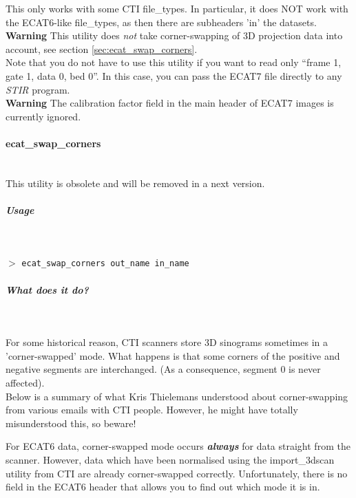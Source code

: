 \documentclass{article}
\newcommand{\subsubsubsection}[1]{\paragraph{#1}\mbox{} \\}
\newcommand{\subsubsubsubsection}[1]{\subparagraph{#1} \mbox{} \\}
\newcommand{\cmdline}[1]{\par \noindent $>$ \texttt{#1}\par}
\begin{document}
{{This only works with some CTI file\_types. In particular, it 
does NOT work with the ECAT6-like file\_types, as then there 
are subheaders 'in' the datasets.\\
\textbf{Warning} This utility does \textit{not} take corner-swapping of 
3D projection data into account, see section \ref{sec:ecat_swap_corners}.\\
Note that you do not have to use this utility if you want to 
read only ``frame 1, gate 1, data 0, bed 0''. In this case, you 
can pass the ECAT7 file directly to any \textit{STIR} program.
\\
\textbf{Warning} The calibration factor field in the main header of ECAT7 images
is currently ignored.

\subsubsubsection{ecat\_swap\_corners}
\label{sec:ecat_swap_corners}
This utility is obsolete and will be removed in a next version.
{ \subsubsubsubsection{Usage}
}
\cmdline{ecat\_swap\_corners out\_name in\_name}

{ \subsubsubsubsection{What does it do?}
}
For some historical reason, CTI scanners store 3D sinograms sometimes 
in a 'corner-swapped' mode. What happens is that some corners 
of the positive and negative segments are interchanged. (As a 
consequence, segment 0 is never affected).\\
Below is a summary of what Kris Thielemans understood about corner-swapping 
from various emails with CTI people. However, he might have totally 
misunderstood this, so beware!



For ECAT6 data, corner-swapped mode occurs \textbf{\textit{always}} for 
data straight from the scanner. However, data which have been 
normalised using the import\_3dscan utility from CTI are already 
corner-swapped correctly. Unfortunately, there is no field in 
the ECAT6 header that allows you to find out which mode it is 
in.



}}
\end{document}
